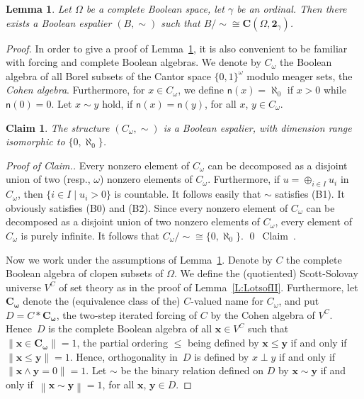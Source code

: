\documentclass[psamsfonts,reqno]{memo-l}
\theoremstyle{plain}
\newtheorem{lemma}{Lemma}[section]
\newtheorem{claim}{Claim}
\theoremstyle{definition}
\theoremstyle{remark}
\newcommand{\qedc}{{\qed}~{\rm Claim~{\theclaim}.}}
\newenvironment{cproof}
{\begin{proof}[Proof of Claim.]}
{\qedc\renewcommand{\qed}{}\end{proof}}
\numberwithin{equation}{section}
\newcommand{\two}{\mathbf{2}}
\renewcommand{\iff}{if and only if}
\newcommand{\CC}{\mathbf{C}}
\newcommand{\nn}{\mathsf{n}}
\newcommand{\Co}{C_{\omega}}
\newcommand{\lCo}{\boldsymbol{C_{\omega}}}
\newcommand{\lx}{\boldsymbol{x}}
\newcommand{\ly}{\boldsymbol{y}}
\newcommand{\bv}[1]{\left\|#1\right\|}
\newcommand{\set}[1]{\{#1\}}
\newcommand{\setm}[2]{\set{#1\mid#2}}
\begin{document}
\begin{lemma}\label{L:LotsofIII}
Let $\Omega$ be a complete Boolean
space, let $\gamma$ be an ordinal. Then there exists a
Boolean espalier
$(B,\sim)$ such that $B/{\sim}\cong\CC(\Omega,\two_\gamma)$.
\index{Tzzgamma@$\two_\gamma$}
\end{lemma}

\begin{proof}
In order to give a proof of Lemma~\ref{L:LotsofIII}, it is also convenient to
be familiar with forcing and
complete Boolean algebras. We denote by $\Co$\index{Czzo@$\Co$|ii}
the Boolean algebra 
of all Borel subsets of the Cantor space
$\set{0,1}^\omega$ modulo meager sets, the 
\emph{Cohen algebra}. Furthermore,
for $x\in\Co$, we define $\nn(x)=\aleph_0$ if $x>0$ while $\nn(0)=0$.
Let $x\sim y$ hold, if $\nn(x)=\nn(y)$, for all $x$, $y\in\Co$.

\setcounter{claim}{0}
\begin{claim}\label{Cl:1b}
The structure $(\Co,\sim)$ is a Boolean
espalier, with dimension range
 isomorphic to
$\set{0,\aleph_0}$.
\end{claim}

\begin{cproof}
Every nonzero element of $\Co$ can be decomposed as a disjoint union of
two (resp., $\omega$) nonzero elements of $\Co$. Furthermore, if
$u=\oplus_{i\in I}u_i$ in $\Co$, then  $\setm{i\in I}{u_i>0}$ is countable.
It follows easily that $\sim$ satisfies (B1). It obviously satisfies (B0) and
(B2). Since every nonzero element of $\Co$ can be decomposed as a disjoint
union of two nonzero elements of $\Co$, every element of $\Co$ is purely
infinite. It follows that $\Co/{\sim}\cong\set{0,\aleph_0}$.
\end{cproof}

Now we work under the assumptions of Lemma~\ref{L:LotsofIII}. Denote by $C$
the complete Boolean algebra
of clopen subsets of $\Omega$. We define the
(quotiented) Scott-Solovay universe $V^C$ of set theory
as in the proof of Lemma~\ref{L:LotsofII}. Furthermore, let
$\lCo$\index{czzlo@$\lCo$|ii} denote the (equivalence class of the)
$C$-valued name for $\Co$, and put
$D=C*\lCo$, the two-step iterated forcing of $C$ by the Cohen algebra
of
$V^C$. Hence~$D$ is the complete Boolean algebra
of all $\lx\in V^C$ such that $\bv{\lx\in\lCo}=1$,
the partial ordering $\leq$ being defined by $\lx\leq\ly$ \iff\
$\bv{\lx\leq\ly}=1$. Hence, orthogonality in~$D$ is defined by $x\perp y$
\iff\ $\bv{\lx\wedge\ly=0}=1$. Let $\sim$ be the binary relation defined on
$D$ by $\lx\sim\ly$ \iff\ $\bv{\lx\sim\ly}=1$, for all $\lx$, $\ly\in D$.


\end{proof}
\end{document}
